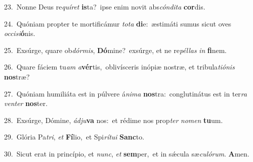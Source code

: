 {\numbfont\textcolor{\numbcolor}{23.}}~Nonne Deus re\-\textit{quí}\-\textit{ret} \textbf{is}\-ta?~\star ipse enim novit abs\-\textit{cón}\-\textit{di}\textit{ta} \textbf{cor}\-dis.\par
{\numbfont\textcolor{\numbcolor}{24.}}~Quóniam propter te mortificámur \textit{to}\-\textit{ta} \textbf{di}\-e:~\star æstimáti sumus sicut oves \textit{oc}\-\textit{ci}\textit{si}\textbf{ó}nis.\par
{\numbfont\textcolor{\numbcolor}{25.}}~Exsúrge, quare ob\-\textit{dór}\-\textit{mis}, \textbf{Dó}\-mine?~\star exsúrge, et ne re\-\textit{pél}\-\textit{las} \textit{in} \textbf{fi}\-nem.\par
{\numbfont\textcolor{\numbcolor}{26.}}~Quare fáciem tu\textit{am} \textit{a}\-\textbf{vér}tis,~\star oblivísceris inópiæ nostræ, et tribula\-\textit{ti}\-\textit{ó}\textit{nis} \textbf{nos}\-træ?\par
{\numbfont\textcolor{\numbcolor}{27.}}~Quóniam humiliáta est in púlvere á\-\textit{ni}\-\textit{ma} \textbf{nos}\-tra:~\star conglutinátus est in ter\textit{ra} \textit{ven}\-\textit{ter} \textbf{nos}\-ter.\par
{\numbfont\textcolor{\numbcolor}{28.}}~Exsúrge, Dómine, \textit{ád}\-\textit{ju}\textbf{va} nos:~\star et rédime nos prop\textit{ter} \textit{no}\-\textit{men} \textbf{tu}\-um.\par
{\numbfont\textcolor{\numbcolor}{29.}}~Glória Pa\-\textit{tri}\-, \textit{et} \textbf{Fí}\-lio,~\star et Spi\-\textit{rí}\-\textit{tu}\textit{i} \textbf{Sanc}\-to.\par
{\numbfont\textcolor{\numbcolor}{30.}}~Sicut erat in princípio, et \textit{nunc}\-, \textit{et} \textbf{sem}\-per,~\star et in sǽcula sæ\-\textit{cu}\-\textit{ló}\textit{rum}. \textbf{A}\-men.\par

